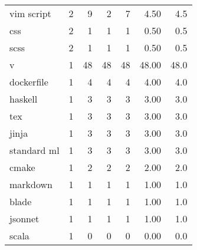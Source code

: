 \begin{tabular}{lrrrrrr}
vim script       &          2 &           9 &    2 &    7 &   4.50 &      4.5 \\
css              &          2 &           1 &    1 &    1 &   0.50 &      0.5 \\
scss             &          2 &           1 &    1 &    1 &   0.50 &      0.5 \\
v                &          1 &          48 &   48 &   48 &  48.00 &     48.0 \\
dockerfile       &          1 &           4 &    4 &    4 &   4.00 &      4.0 \\
haskell          &          1 &           3 &    3 &    3 &   3.00 &      3.0 \\
tex              &          1 &           3 &    3 &    3 &   3.00 &      3.0 \\
jinja            &          1 &           3 &    3 &    3 &   3.00 &      3.0 \\
standard ml      &          1 &           3 &    3 &    3 &   3.00 &      3.0 \\
cmake            &          1 &           2 &    2 &    2 &   2.00 &      2.0 \\
markdown         &          1 &           1 &    1 &    1 &   1.00 &      1.0 \\
blade            &          1 &           1 &    1 &    1 &   1.00 &      1.0 \\
jsonnet          &          1 &           1 &    1 &    1 &   1.00 &      1.0 \\
scala            &          1 &           0 &    0 &    0 &   0.00 &      0.0 \\
\bottomrule
\end{tabular}
